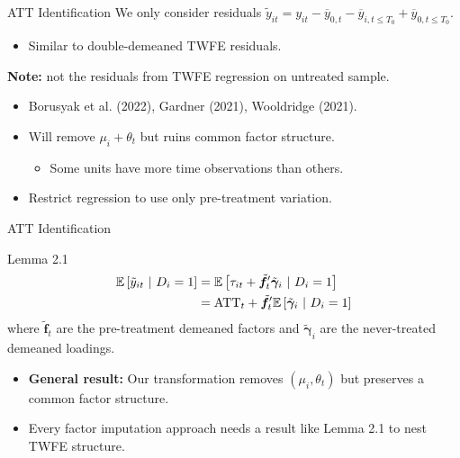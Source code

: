 \documentclass{beamer}
\newcommand{\1}{\mathds{1}} %
\newcommand{\condexpec}[2]{\mathbb{E}\left[#1 \ \vert \ #2\right]}
\begin{document}


\begin{frame}{ATT Identification}
    We only consider residuals $\tilde{y}_{it} = y_{it} - \overline{y}_{0,t} - \overline{y}_{i,t \leq T_0} + \overline{y}_{0, t \leq T_0}$.
    \begin{itemize}
        \item Similar to double-demeaned TWFE residuals.
    \end{itemize}

    \vspace{.5 cm}

    \textbf{Note:} not the residuals from TWFE regression on untreated sample.
    \begin{itemize}
        \item Borusyak et al. (2022), Gardner (2021), Wooldridge (2021).
        \item Will remove $\mu_i + \theta_t$ but ruins common factor structure.
        \begin{itemize}
            \item Some units have more time observations than others.
        \end{itemize}
        \item Restrict regression to use only pre-treatment variation.
    \end{itemize}

    
\end{frame}


\begin{frame}{ATT Identification}

    \begin{block}{Lemma 2.1}
        \begin{align*}
            \condexpec{\tilde{y}_{it}}{D_i = 1} 
            &= \condexpec{\tau_{it} + \tilde{\bm f}_t' \tilde{\bm \gamma}_i }{D_i = 1}\\
            &= \text{ATT}_t + \tilde{\bm f}'_t \condexpec{\Tilde{\bm \gamma}_i}{D_i = 1}
        \end{align*}
        where $\tilde{\bm f}_t$ are the pre-treatment demeaned factors and $\tilde{\bm \gamma}_i$ are the never-treated demeaned loadings.
    \end{block}
    \begin{itemize}
        \item \textbf{General result:} Our transformation removes $(\mu_i, \theta_t)$ but preserves a common factor structure.
        \item Every factor imputation approach needs a result like Lemma 2.1 to nest TWFE structure.
    \end{itemize}

    
\end{frame}
\end{document}
